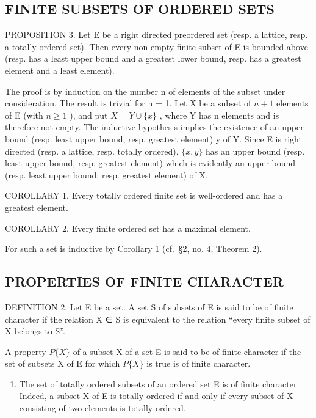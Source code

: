 \subsection{FINITE SUBSETS OF ORDERED SETS}

PROPOSITION 3. Let E be a right directed preordered set (resp. a lattice, resp. a totally ordered set). Then every non-empty finite subset of E is bounded above (resp. has a least upper bound and a greatest lower bound, resp. has a greatest element and a least element).

The proof is by induction on the number n of elements of the subset under consideration. The result is trivial for n = 1. Let X be a subset of \(n + 1\) elements of E (with \(n \geqslant 1\) ), and put \(X = Y \cup \{x\}\) , where Y has n elements and is therefore not empty. The inductive hypothesis implies the existence of an upper bound (resp. least upper bound, resp. greatest element) y of Y. Since E is right directed (resp. a lattice, resp. totally ordered), \(\{x, y\}\) has an upper bound (resp. least upper bound, resp. greatest element) which is evidently an upper bound (resp. least upper bound, resp. greatest element) of X.

COROLLARY 1. Every totally ordered finite set is well-ordered and has a greatest element.

COROLLARY 2. Every finite ordered set has a maximal element.

For such a set is inductive by Corollary 1 (cf.~§2, no. 4, Theorem 2).

\subsection{PROPERTIES OF FINITE CHARACTER}

DEFINITION 2. Let E be a set. A set S of subsets of E is said to be of finite character if the relation X ∈ S is equivalent to the relation ``every finite subset of X belongs to S''.

A property \(P\{X\}\) of a subset X of a set E is said to be of finite character if the set of subsets X of E for which \(P\{X\}\) is true is of finite character.


\begin{enumerate}
\def\labelenumi{(\arabic{enumi})}
\tightlist
\item
  The set of totally ordered subsets of an ordered set E is of finite character. Indeed, a subset X of E is totally ordered if and only if every subset of X consisting of two elements is totally ordered.
\end{enumerate}

